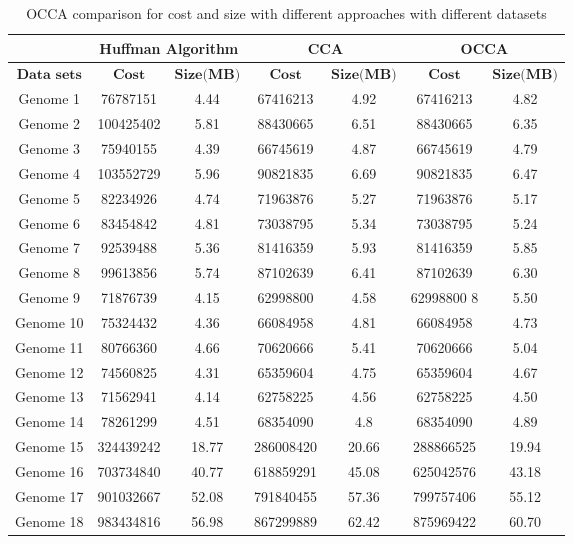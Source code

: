 \documentclass[preprint,12pt]{elsarticle}
\begin{document}
\begin{table}[h]
\small
\label{table4}
\caption{OCCA comparison for cost and size with different approaches with different datasets}
\centering
\begin{tabular}{c | c c | c c | c c}
\toprule
 & \multicolumn{2}{c}{Huffman Algorithm} & \multicolumn{2}{c}{CCA }& \multicolumn{2}{c}{OCCA}\\\hline
$\textbf{Data sets}$ & $\textbf{Cost}$	& $\textbf{Size(MB)}$ &	$\textbf{Cost}$&	$\textbf{Size(MB)}$&$\textbf{Cost}$&	$\textbf{Size(MB)}$
\\\hline
Genome 1& 76787151  &	4.44	&67416213   & 4.92	& 67416213 & 4.82 \\\hline
Genome 2& 100425402 &  	5.81	& 88430665	& 6.51	& 88430665&  6.35 \\\hline
Genome 3& 75940155  &	4.39    &66745619	& 4.87&	66745619 & 4.79 \\\hline
Genome 4& 103552729 &	5.96    &90821835&	6.69 &	90821835  & 6.47\\\hline
Genome 5& 82234926  &	4.74	&71963876	& 5.27 &	71963876 &5.17 \\\hline
Genome 6& 83454842  &   4.81	&73038795	& 5.34	&73038795 & 5.24\\\hline
Genome 7& 92539488  &	5.36    &81416359   &5.93	&81416359 & 5.85\\\hline
Genome 8& 99613856  & 	5.74	&87102639   &6.41	&87102639&	6.30 \\\hline
Genome 9& 71876739  &	4.15    &62998800  &4.58 &	62998800 8&	5.50 \\\hline
Genome 10& 75324432 & 	4.36	&66084958  &4.81	&66084958&	4.73 \\\hline
Genome 11& 80766360 &	4.66    &70620666  &5.41&	70620666&	5.04 \\\hline
Genome 12& 74560825 &	4.31    &65359604  &4.75	&65359604&	4.67\\\hline
Genome 13& 71562941 & 	4.14	&62758225  &4.56	&	62758225 &	4.50\\\hline
Genome 14& 78261299 & 	4.51    &68354090  &4.8&	68354090& 4.89  \\\hline
Genome 15& 324439242& 	18.77    &286008420 & 20.66	 &	288866525 &	19.94 \\\hline
Genome 16& 703734840&  40.77    &618859291 & 45.08  &	625042576 &	43.18 \\\hline
Genome 17& 901032667&  52.08    &791840455 &	57.36 &	799757406 &	55.12 \\\hline
Genome 18& 983434816&  56.98    &867299889 &	62.42 &	875969422 & 60.70 \\\hline

\bottomrule
\end{tabular}
\end{table}
\end{document}
